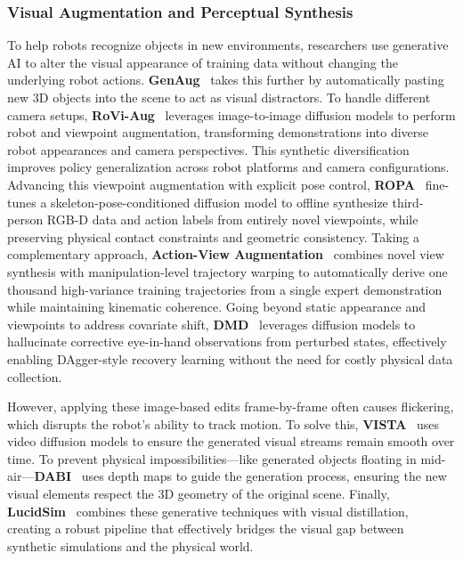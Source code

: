 \documentclass[acmsmall,screen,review,anonymous]{acmart}
\begin{document}
\subsubsection{Visual Augmentation and Perceptual Synthesis}\label{sec:trajectory_redrawing}

To help robots recognize objects in new environments, researchers use generative AI to alter the visual appearance of training data without changing the underlying robot actions. \textbf{GenAug}~\cite{chen2023genaug} takes this further by automatically pasting new 3D objects into the scene to act as visual distractors. To handle different camera setups, \textbf{RoVi-Aug}~\cite{chen2024roviaug} leverages image-to-image diffusion models to perform robot and viewpoint augmentation, transforming demonstrations into diverse robot appearances and camera perspectives. This synthetic diversification improves policy generalization across robot platforms and camera configurations. Advancing this viewpoint augmentation with explicit pose control, \textbf{ROPA}~\cite{chen2025ropa} fine-tunes a skeleton-pose-conditioned diffusion model to offline synthesize third-person RGB-D data and action labels from entirely novel viewpoints, while preserving physical contact constraints and geometric consistency. Taking a complementary approach, \textbf{Action-View Augmentation}~\cite{pan2025one} combines novel view synthesis with manipulation-level trajectory warping to automatically derive one thousand high-variance training trajectories from a single expert demonstration while maintaining kinematic coherence. Going beyond static appearance and viewpoints to address covariate shift, \textbf{DMD}~\cite{zhang2024dmd} leverages diffusion models to hallucinate corrective eye-in-hand observations from perturbed states, effectively enabling DAgger-style recovery learning without the need for costly physical data collection.

However, applying these image-based edits frame-by-frame often causes flickering, which disrupts the robot's ability to track motion. To solve this, \textbf{VISTA}~\cite{wang2024vista} uses video diffusion models to ensure the generated visual streams remain smooth over time. To prevent physical impossibilities—like generated objects floating in mid-air—\textbf{DABI}~\cite{li2024dabi} uses depth maps to guide the generation process, ensuring the new visual elements respect the 3D geometry of the original scene. Finally, \textbf{LucidSim}~\cite{mishra2024lucidsim} combines these generative techniques with visual distillation, creating a robust pipeline that effectively bridges the visual gap between synthetic simulations and the physical world.
\end{document}
